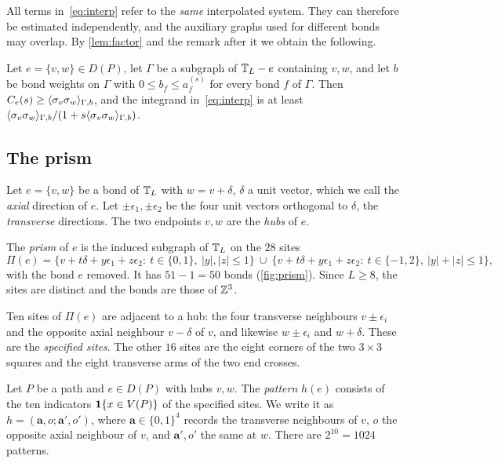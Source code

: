 All terms in~\eqref{eq:interp} refer to the \emph{same} interpolated system. They can therefore be estimated independently, and the auxiliary graphs used for different bonds may overlap. By \cref{lem:factor} and the remark after it we obtain the following.

\begin{corollary}\label{cor:local}
Let $e=\{v,w\}\in D(P)$, let $\Gamma$ be a subgraph of $\mathbb T_L-e$ containing $v,w$, and let $b$ be bond weights on $\Gamma$ with $0\le b_f\le a^{(s)}_f$ for every bond $f$ of $\Gamma$. Then $C_e(s)\ge\langle \sigma_v\sigma_w\rangle_{\Gamma,b}$, and the integrand in~\eqref{eq:interp} is at least $\langle \sigma_v\sigma_w\rangle_{\Gamma,b}/(1+s\langle \sigma_v\sigma_w\rangle_{\Gamma,b})$.
\end{corollary}

\subsection{The prism}

Let $e=\{v,w\}$ be a bond of $\mathbb T_L$ with $w=v+\delta$, $\delta$ a unit vector, which we call the \emph{axial} direction of $e$. Let $\pm\epsilon_1,\pm\epsilon_2$ be the four unit vectors orthogonal to $\delta$, the \emph{transverse} directions. The two endpoints $v,w$ are the \emph{hubs} of $e$.

\begin{definition}[Prism]\label{def:prism}
The \emph{prism} of $e$ is the induced subgraph of $\mathbb T_L$ on the $28$ sites
\[
 \Pi(e)=\{v+t\delta+y\epsilon_1+z\epsilon_2:\ t\in\{0,1\},\ |y|,|z|\le1\}\ \cup\
 \{v+t\delta+y\epsilon_1+z\epsilon_2:\ t\in\{-1,2\},\ |y|+|z|\le1\},
\]
with the bond $e$ removed. It has $51-1=50$ bonds (\cref{fig:prism}). Since $L\ge8$, the sites are distinct and the bonds are those of $\mathbb Z^3$.
\end{definition}

Ten sites of $\Pi(e)$ are adjacent to a hub: the four transverse neighbours $v\pm\epsilon_i$ and the opposite axial neighbour $v-\delta$ of $v$, and likewise $w\pm\epsilon_i$ and $w+\delta$. These are the \emph{specified sites}. The other $16$ sites are the eight corners of the two $3\times3$ squares and the eight transverse arms of the two end crosses.

\begin{definition}[Pattern]\label{def:pattern}
Let $P$ be a path and $e\in D(P)$ with hubs $v,w$. The \emph{pattern} $h(e)$ consists of the ten indicators $\mathbf 1\{x\in V(P)\}$ of the specified sites. We write it as $h=(\mathbf a,o;\mathbf a',o')$, where $\mathbf a\in\{0,1\}^4$ records the transverse neighbours of $v$, $o$ the opposite axial neighbour of $v$, and $\mathbf a',o'$ the same at $w$. There are $2^{10}=1024$ patterns.
\end{definition}

